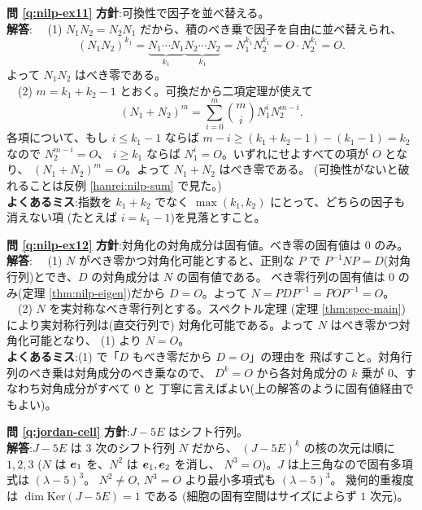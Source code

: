 \bigskip
\noindent\textbf{問 \ref{q:nilp-ex11}}\quad
\textbf{方針}:可換性で因子を並べ替える。\\
\textbf{解答}:
　(1) $N_1 N_2 = N_2 N_1$ だから、積のべき乗で因子を自由に並べ替えられ、
\[
(N_1 N_2)^{k_1} = \underbrace{N_1 \cdots N_1}_{k_1}
\underbrace{N_2 \cdots N_2}_{k_1} = N_1^{k_1} N_2^{k_1} = O \cdot N_2^{k_1} = O.
\]
よって $N_1 N_2$ はべき零である。\\
　(2) $m = k_1 + k_2 - 1$ とおく。可換だから二項定理が使えて
\[
(N_1 + N_2)^m = \sum_{i=0}^{m} \binom{m}{i} N_1^i N_2^{m-i}.
\]
各項について、もし $i \le k_1 - 1$ ならば
$m - i \ge (k_1 + k_2 - 1) - (k_1 - 1) = k_2$ なので $N_2^{m-i} = O$、
$i \ge k_1$ ならば $N_1^i = O$。いずれにせよすべての項が $O$ となり、
$(N_1 + N_2)^m = O$。よって $N_1 + N_2$ はべき零である。
(可換性がないと破れることは反例 \ref{hanrei:nilp-sum} で見た。)\\
\textbf{よくあるミス}:指数を $k_1 + k_2$ でなく
$\max(k_1, k_2)$ にとって、どちらの因子も消えない項
(たとえば $i = k_1 - 1$)を見落とすこと。

\bigskip
\noindent\textbf{問 \ref{q:nilp-ex12}}\quad
\textbf{方針}:対角化の対角成分は固有値。べき零の固有値は $0$ のみ。\\
\textbf{解答}:
　(1) $N$ がべき零かつ対角化可能とすると、正則な $P$ で
$P^{-1}NP = D$(対角行列)とでき、$D$ の対角成分は $N$ の固有値である。
べき零行列の固有値は $0$ のみ(定理 \ref{thm:nilp-eigen})だから
$D = O$。よって $N = PDP^{-1} = POP^{-1} = O$。\\
　(2) $N$ を実対称なべき零行列とする。スペクトル定理
(定理 \ref{thm:spec-main})により実対称行列は(直交行列で)
対角化可能である。よって $N$ はべき零かつ対角化可能となり、
(1) より $N = O$。\\
\textbf{よくあるミス}:(1) で「$D$ もべき零だから $D = O$」の理由を
飛ばすこと。対角行列のべき乗は対角成分のべき乗なので、
$D^k = O$ から各対角成分の $k$ 乗が $0$、すなわち対角成分がすべて $0$ と
丁寧に言えばよい(上の解答のように固有値経由でもよい)。

\bigskip
\noindent\textbf{問 \ref{q:jordan-cell}}\quad
\textbf{方針}:$J - 5E$ はシフト行列。\\
\textbf{解答}:$J - 5E$ は $3$ 次のシフト行列 $N$ だから、
$(J - 5E)^k$ の核の次元は順に $1, 2, 3$
($N$ は $\bm{e}_1$ を、$N^2$ は $\bm{e}_1, \bm{e}_2$ を消し、
$N^3 = O$)。$J$ は上三角なので固有多項式は $(\lambda - 5)^3$。
$N^2 \neq O$, $N^3 = O$ より最小多項式も $(\lambda - 5)^3$。
幾何的重複度は $\dim \mathrm{Ker}(J - 5E) = 1$ である
(細胞の固有空間はサイズによらず $1$ 次元)。

